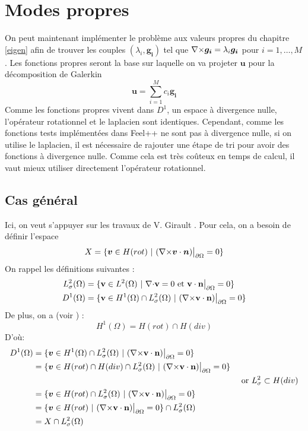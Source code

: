 \chapter{Modes propres}
On peut maintenant implémenter le problème aux valeurs propres du chapitre \ref{eigen} afin de trouver les couples $(\lambda_i,\bm{g_i})$ tel que ${\nabla\times}\bm{g_i}=\lambda_i\bm{g_i}$ pour $i=1,\dots,M$. Les fonctions propres seront la base sur laquelle on va projeter $\bm{u}$ pour la décomposition de Galerkin \[ \bm{u}=\sum_{i=1}^M c_i\bm{g_i} \]
Comme les fonctions propres vivent dans $D^1$, un espace à divergence nulle, l'opérateur rotationnel et le laplacien sont identiques. Cependant, comme les fonctions tests implémentées dans Feel++ ne sont pas à divergence nulle, si on utilise le laplacien, il est nécessaire de rajouter une étape de tri pour avoir des fonctions à divergence nulle. Comme cela est très coûteux en temps de calcul, il vaut mieux utiliser directement l'opérateur rotationnel.

\section{Cas général}
Ici, on veut s'appuyer sur les travaux de V. Girault \cite{girault90-1}. Pour cela, on a besoin de définir l'espace \[X = \{\bm{v}\in H(rot)\ |\ ({\nabla\times}\bm{v}\cdot\bm{n}){\big\rvert_{\partial\Omega}}=0 \}\]
On rappel les définitions suivantes :
\begin{align*}
L^2_\sigma(\Omega) &= \{\mathbf{v} \in L^2(\Omega)\ |\ \div \mathbf{v} = 0\text{ et }\mathbf{v}\cdot \mathbf{n}\restr = 0 \}\\
D^1(\Omega) &= \{\mathbf{v} \in H^1(\Omega)\cap L^2_\sigma(\Omega)\ |\ (\rot \mathbf{v}\cdot \mathbf{n})\restr = 0  \}
\end{align*}
De plus, on a (voir \cite{Girault79}) :
\[ H^1(\Omega)=H(rot)\cap H(div) \]
D'où:
\begin{align*}
D^1(\Omega) &= \{\bm{v}\in H^1(\Omega)\cap L^2_\sigma(\Omega)\ |\ (\rot \mathbf{v}\cdot \mathbf{n})\restr = 0  \}&\\
&=\{\bm{v}\in H(rot)\cap H(div)\cap L^2_\sigma(\Omega)\ |\ (\rot \mathbf{v}\cdot \mathbf{n})\restr = 0  \}&\\
&&\text{ or }L^2_\sigma\subset H(div)\\
&=\{\bm{v}\in H(rot)\cap L^2_\sigma(\Omega)\ |\ (\rot \mathbf{v}\cdot \mathbf{n})\restr = 0  \}&\\
&=\{\bm{v}\in H(rot)\ |\ (\rot \mathbf{v}\cdot \mathbf{n})\restr = 0  \}\cap L^2_\sigma(\Omega)&\\
&=X\cap L^2_\sigma(\Omega)&
\end{align*}

